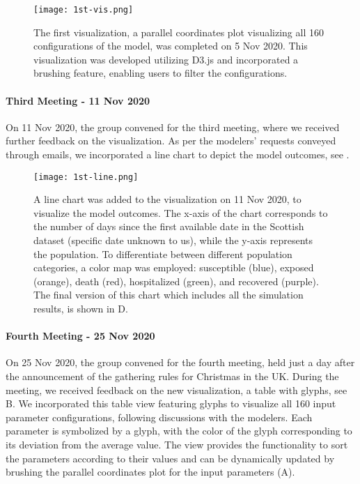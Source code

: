 \begin{figure}[tb!]
    \centering
    \texttt{[image: 1st-vis.png]}
    \caption{The first visualization, a parallel coordinates plot visualizing all 160 configurations of the model, was completed on 5 Nov 2020. This visualization was developed utilizing D3.js and incorporated a brushing feature, enabling users to filter the configurations.
    }
    \label{fig:1st-vis}

\end{figure}

\paragraph{Third Meeting - 11 Nov 2020}
On 11 Nov 2020, the group convened for the third meeting, where we received further feedback on the visualization. As per the modelers' requests conveyed through emails, we incorporated a line chart to depict the model outcomes, see .

\begin{figure}[tb!]
    \centering
    \texttt{[image: 1st-line.png]}
    \caption{A line chart was added to the visualization on 11 Nov 2020, to visualize the model outcomes.
    The x-axis of the chart corresponds to the number of days since the first available date in the Scottish dataset (specific date unknown to us), while the y-axis represents the population.
    To differentiate between different population categories, a color map was employed: susceptible (blue), exposed (orange), death (red), hospitalized (green), and recovered (purple).
    The final version of this chart which includes all the simulation results, is shown in D.
    }
    \label{fig:1st-line}

\end{figure}

\paragraph{Fourth Meeting - 25 Nov 2020}
On 25 Nov 2020, the group convened for the fourth meeting, held just a day after the announcement of the gathering rules for Christmas in the UK.
During the meeting, we received feedback on the new visualization, a table with glyphs, see B. We incorporated this table view featuring glyphs to visualize all 160 input parameter configurations, following discussions with the modelers.
Each parameter is symbolized by a glyph, with the color of the glyph corresponding to its deviation from the average value.
The view provides the functionality to sort the parameters according to their values and can be dynamically updated by brushing the parallel coordinates plot for the input parameters (A).

